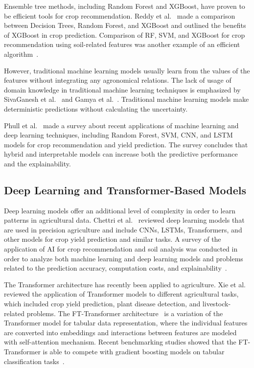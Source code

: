 \documentclass[journal]{IEEEtran}
\begin{document}
Ensemble tree methods, including Random Forest and XGBoost, have proven to be efficient tools for crop recommendation. Reddy et al.~\cite{reddy2025comparative} made a comparison between Decision Trees, Random Forest, and XGBoost and outlined the benefits of XGBoost in crop prediction. Comparison of RF, SVM, and XGBoost for crop recommendation using soil-related features was another example of an efficient algorithm~\cite{xgboost2026comparative}.

However, traditional machine learning models usually learn from the values of the features without integrating any agronomical relations. The lack of usage of domain knowledge in traditional machine learning techniques is emphasized by SivaGanesh et al.~\cite{sivaganesh2026machine} and Gamya et al.~\cite{gamya2025comparative}. Traditional machine learning models make deterministic predictions without calculating the uncertainty.

Phull et al.~\cite{phull2025advances} made a survey about recent applications of machine learning and deep learning techniques, including Random Forest, SVM, CNN, and LSTM models for crop recommendation and yield prediction. The survey concludes that hybrid and interpretable models can increase both the predictive performance and the explainability.

\subsection{Deep Learning and Transformer-Based Models}

Deep learning models offer an additional level of complexity in order to learn patterns in agricultural data. Chettri et al.~\cite{chettri2026deep} reviewed deep learning models that are used in precision agriculture and include CNNs, LSTMs, Transformers, and other models for crop yield prediction and similar tasks. A survey of the application of AI for crop recommendation and soil analysis was conducted in order to analyze both machine learning and deep learning models and problems related to the prediction accuracy, computation costs, and explainability~\cite{ai2024comprehensive}.

The Transformer architecture has recently been applied to agriculture. Xie et al.~\cite{xie2024recent} reviewed the application of Transformer models to different agricultural tasks, which included crop yield prediction, plant disease detection, and livestock-related problems. The FT-Transformer architecture~\cite{gorishniy2021revisiting} is a variation of the Transformer model for tabular data representation, where the individual features are converted into embeddings and interactions between features are modeled with self-attention mechanism. Recent benchmarking studies showed that the FT-Transformer is able to compete with gradient boosting models on tabular classification tasks~\cite{fttransformer2026benchmarking}.
\end{document}
